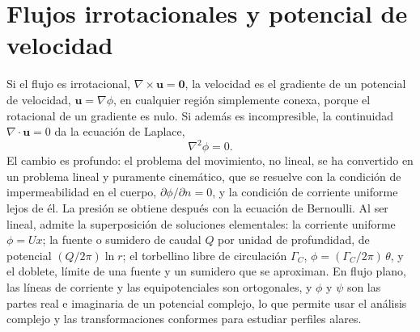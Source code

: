 \documentclass[10pt,openany]{book}
\begin{document}
\section{Flujos irrotacionales y potencial de velocidad}

Si el flujo es irrotacional, \(\nabla\times\mathbf{u} = \mathbf{0}\), la velocidad es el gradiente de un potencial de velocidad, \(\mathbf{u} = \nabla\phi\), en cualquier región simplemente conexa, porque el rotacional de un gradiente es nulo. Si además es incompresible, la continuidad \(\nabla\cdot\mathbf{u} = 0\) da la ecuación de Laplace,
\begin{equation}
\nabla^{2}\phi = 0. \label{eq:c12-laplace}
\end{equation}
El cambio es profundo: el problema del movimiento, no lineal, se ha convertido en un problema lineal y puramente cinemático, que se resuelve con la condición de impermeabilidad en el cuerpo, \(\partial\phi/\partial n = 0\), y la condición de corriente uniforme lejos de él. La presión se obtiene después con la ecuación de Bernoulli. Al ser lineal, admite la superposición de soluciones elementales: la corriente uniforme \(\phi = U x\); la fuente o sumidero de caudal \(Q\) por unidad de profundidad, de potencial \((Q/2\pi)\ln r\); el torbellino libre de circulación \(\Gamma_C\), \(\phi = (\Gamma_C/2\pi)\,\theta\), y el doblete, límite de una fuente y un sumidero que se aproximan. En flujo plano, las líneas de corriente y las equipotenciales son ortogonales, y \(\phi\) y \(\psi\) son las partes real e imaginaria de un potencial complejo, lo que permite usar el análisis complejo y las transformaciones conformes para estudiar perfiles alares.
\end{document}
